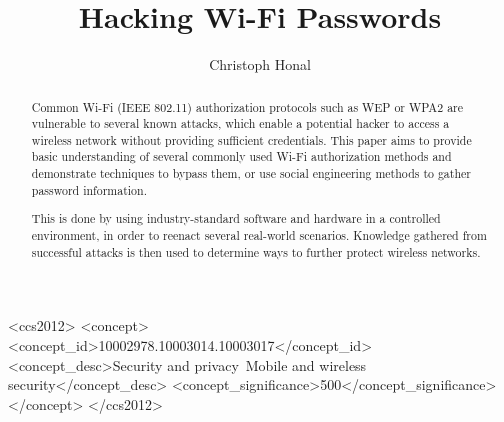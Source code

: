 \documentclass[sigconf]{acmart}
\begin{document}
\title{Hacking Wi-Fi Passwords}

\author{Christoph Honal}

\begin{abstract}
Common Wi-Fi (IEEE 802.11) authorization protocols such as WEP or WPA2 are vulnerable to several known attacks, which enable a potential hacker to access a wireless network without providing sufficient credentials. This paper aims to provide basic understanding of several commonly used Wi-Fi authorization methods and demonstrate techniques to bypass them, or use social engineering methods to gather password information. 

This is done by using industry-standard software and hardware in a controlled environment, in order to reenact several real-world scenarios. Knowledge gathered from successful attacks is then used to determine ways to further protect wireless networks.
\end{abstract}

\begin{CCSXML}
<ccs2012>
<concept>
<concept_id>10002978.10003014.10003017</concept_id>
<concept_desc>Security and privacy~Mobile and wireless security</concept_desc>
<concept_significance>500</concept_significance>
</concept>
</ccs2012>
\end{CCSXML}



\maketitle





\end{document}
